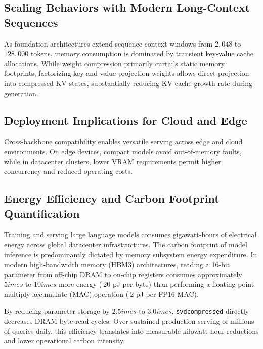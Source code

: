\subsection{Scaling Behaviors with Modern Long-Context Sequences}
As foundation architectures extend sequence context windows from $2{,}048$ to $128{,}000$ tokens, memory consumption is dominated by transient key-value cache allocations. While weight compression primarily curtails static memory footprints, factorizing key and value projection weights allows direct projection into compressed KV states, substantially reducing KV-cache growth rate during generation.

\subsection{Deployment Implications for Cloud and Edge}
Cross-backbone compatibility enables versatile serving across edge and cloud environments. On edge devices, compact models avoid out-of-memory faults, while in datacenter clusters, lower VRAM requirements permit higher concurrency and reduced operating costs.

\subsection{Energy Efficiency and Carbon Footprint Quantification}
Training and serving large language models consumes gigawatt-hours of electrical energy across global datacenter infrastructures. The carbon footprint of model inference is predominantly dictated by memory subsystem energy expenditure. In modern high-bandwidth memory (HBM3) architectures, reading a 16-bit parameter from off-chip DRAM to on-chip registers consumes approximately $5	imes$ to $10	imes$ more energy ($~20$ pJ per byte) than performing a floating-point multiply-accumulate (MAC) operation ($~2$ pJ per FP16 MAC).

By reducing parameter storage by $2.5	imes$ to $3.0	imes$, \texttt{svdcompressed} directly decreases DRAM byte-read cycles. Over sustained production serving of millions of queries daily, this efficiency translates into measurable kilowatt-hour reductions and lower operational carbon intensity.
